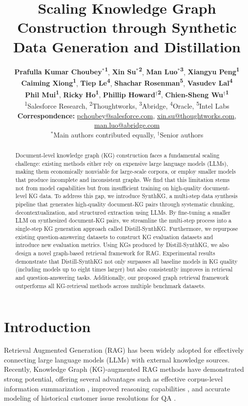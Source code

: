 \documentclass{article} %
\title{Scaling Knowledge Graph Construction through Synthetic Data Generation and Distillation}
\author{\textbf{Prafulla Kumar Choubey$^{*}$\textsuperscript{1}},
 \textbf{Xin Su$^{*}$\textsuperscript{2}},
 \textbf{Man Luo$^{*}$\textsuperscript{3}},
 \textbf{Xiangyu Peng\textsuperscript{1}}
\\
 \textbf{Caiming Xiong\textsuperscript{1}},
 \textbf{Tiep Le\textsuperscript{4}},
 \textbf{Shachar Rosenman\textsuperscript{5}},
 \textbf{Vasudev Lal\textsuperscript{4}}
\\
 \textbf{Phil Mui\textsuperscript{1}},
 \textbf{Ricky Ho\textsuperscript{1}},
 \textbf{Phillip Howard$^{\dagger}$\textsuperscript{2}},
 \textbf{Chien-Sheng Wu$^{\dagger}$\textsuperscript{1}}
\\
 \textsuperscript{1}Salesforce Research,
 \textsuperscript{2}Thoughtworks,
 \textsuperscript{3}Abridge,
 \textsuperscript{4}Oracle,
 \textsuperscript{5}Intel Labs
\\
 \small{
   \textbf{Correspondence:} \href{mailto:pchoubey@salesforce.com}{pchoubey@salesforce.com}, \href{mailto:xin.su@thoughtworks.com}{xin.su@thoughtworks.com}, \href{mailto:man.luo@abridge.com}{man.luo@abridge.com}
 } \\
 \small{
   $^{*}$Main authors contributed equally, $^{\dagger}$Senior authors
}\\
}
\begin{document}
\maketitle

\begin{abstract}
Document-level knowledge graph (KG) construction faces a fundamental scaling challenge: existing methods either rely on expensive large language models (LLMs), making them economically nonviable for large-scale corpora, or employ smaller models that produce incomplete and inconsistent graphs. We find that this limitation stems not from model capabilities but from insufficient training on high-quality document-level KG data.
To address this gap, we introduce SynthKG, a multi-step data synthesis pipeline that generates high-quality document-KG pairs through systematic chunking, decontextualization, and structured extraction using LLMs.
By fine-tuning a smaller LLM on synthesized document-KG pairs, we streamline the multi-step process into a single-step KG generation approach called Distill-SynthKG.
Furthermore, we repurpose existing question-answering datasets to construct KG evaluation datasets and introduce new evaluation metrics. Using KGs produced by Distill-SynthKG, we also design a novel graph-based retrieval framework for RAG. Experimental results demonstrate that Distill-SynthKG not only surpasses all baseline models in KG quality (including models up to eight times larger) but also consistently improves in retrieval and question-answering tasks. Additionally, our proposed graph retrieval framework outperforms all KG-retrieval methods across multiple benchmark datasets. 
\end{abstract}

\section{Introduction}

Retrieval Augmented Generation (RAG) has been widely adopted for effectively connecting large language models (LLMs) with external knowledge sources. Recently, Knowledge Graph (KG)-augmented RAG methods have demonstrated strong potential, offering several advantages such as effective corpus-level information summarization \citep{edge2024from}, improved reasoning capabilities \citep{gutiérrez2024hipporag, li2024graphreaderbuildinggraphbasedagent}, and accurate modeling of historical customer issue resolutions for QA \citep{Xu_2024}.
\end{document}
